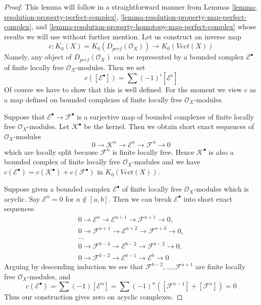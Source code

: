 \begin{proof}
This lemma will follow in a straightforward manner from
Lemmas \ref{lemma-resolution-property-perfect-complex},
\ref{lemma-resolution-property-map-perfect-complex}, and
\ref{lemma-resolution-property-homotopy-map-perfect-complex}
whose results we will use without further mention.
Let us construct an inverse map
$$
c : K_0(X) = K_0(D_{perf}(\mathcal{O}_X)) \longrightarrow
K_0(\textit{Vect}(X))
$$
Namely, any object of $D_{perf}(\mathcal{O}_X)$ can be represented
by a bounded complex $\mathcal{E}^\bullet$ of finite locally free
$\mathcal{O}_X$-modules. Then we set
$$
c([\mathcal{E}^\bullet]) = \sum (-1)^i[\mathcal{E}^i]
$$
Of course we have to show that this is well defined. For the moment
we view $c$ as a map defined on bounded complexes of finite locally free
$\mathcal{O}_X$-modules.

\medskip\noindent
Suppose that $\mathcal{E}^\bullet \to \mathcal{F}^\bullet$ is a surjective map
of bounded complexes of finite locally free $\mathcal{O}_X$-modules.
Let $\mathcal{K}^\bullet$ be the kernel. Then we obtain short exact
sequences of $\mathcal{O}_X$-modules
$$
0 \to \mathcal{K}^n \to \mathcal{E}^n \to \mathcal{F}^n \to 0
$$
which are locally split because $\mathcal{F}^n$ is finite locally free.
Hence $\mathcal{K}^\bullet$ is also a bounded complex of finite
locally free $\mathcal{O}_X$-modules and we have
$c(\mathcal{E}^\bullet) = c(\mathcal{K}^\bullet) + c(\mathcal{F}^\bullet)$
in $K_0(\textit{Vect}(X))$.

\medskip\noindent
Suppose given a bounded complex $\mathcal{E}^\bullet$
of finite locally free $\mathcal{O}_X$-modules which is acyclic.
Say $\mathcal{E}^n = 0$ for $n \not \in [a, b]$. Then we
can break $\mathcal{E}^\bullet$ into short exact sequences
$$
\begin{matrix}
0 \to \mathcal{E}^a \to \mathcal{E}^{a + 1} \to \mathcal{F}^{a + 1} \to 0,\\
0 \to \mathcal{F}^{a + 1} \to \mathcal{E}^{a + 2} \to
\mathcal{F}^{a + 3} \to 0, \\
\ldots \\
0 \to \mathcal{F}^{b - 3} \to \mathcal{E}^{b - 2} \to
\mathcal{F}^{b - 2} \to 0, \\
0 \to \mathcal{F}^{b - 2} \to \mathcal{E}^{b - 1} \to \mathcal{E}^b \to 0
\end{matrix}
$$
Arguing by descending induction we see that
$\mathcal{F}^{b - 2}, \ldots, \mathcal{F}^{a + 1}$
are finite locally free $\mathcal{O}_X$-modules, and
$$
c(\mathcal{E}^\bullet) = \sum (-1)[\mathcal{E}^n] =
\sum (-1)^n([\mathcal{F}^{n - 1}] + [\mathcal{F}^n]) = 0
$$
Thus our construction gives zero on acyclic complexes.


\end{proof}
